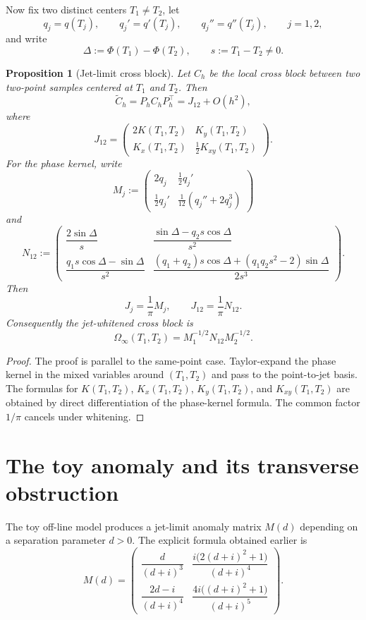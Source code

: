 \documentclass[11pt]{article}
\theoremstyle{plain}
\newtheorem{proposition}[theorem]{Proposition}
\theoremstyle{definition}
\newcommand{\wt}{\widetilde}
\begin{document}
Now fix two distinct centers $T_1\neq T_2$, let
\[
q_j=q(T_j),\qquad q_j'=q'(T_j),\qquad q_j''=q''(T_j),\qquad j=1,2,
\]
and write
\[
\Delta:=\Phi(T_1)-\Phi(T_2),\qquad s:=T_1-T_2\neq 0.
\]

\begin{proposition}[Jet-limit cross block]
Let $C_h$ be the local cross block between two two-point samples centered at $T_1$ and $T_2$. Then
\[
\wt C_h=P_hC_hP_h^\top=J_{12}+O(h^2),
\]
where
\[
J_{12}=
\begin{pmatrix}
2K(T_1,T_2) & K_y(T_1,T_2)\\[1ex]
K_x(T_1,T_2) & \frac12 K_{xy}(T_1,T_2)
\end{pmatrix}.
\]
For the phase kernel, write
\[
M_j:=
\begin{pmatrix}
2q_j & \frac12 q_j'\\[1ex]
\frac12 q_j' & \frac1{12}(q_j''+2q_j^3)
\end{pmatrix}
\]
and
\[
N_{12}:=
\begin{pmatrix}
\dfrac{2\sin\Delta}{s} & \dfrac{\sin\Delta-q_2s\cos\Delta}{s^2}\\[2ex]
\dfrac{q_1s\cos\Delta-\sin\Delta}{s^2} & \dfrac{(q_1+q_2)s\cos\Delta+(q_1q_2s^2-2)\sin\Delta}{2s^3}
\end{pmatrix}.
\]
Then
\[
J_j=\frac1\pi M_j,
\qquad
J_{12}=\frac1\pi N_{12}.
\]
Consequently the jet-whitened cross block is
\[
\Omega_\infty(T_1,T_2)=M_1^{-1/2}N_{12}M_2^{-1/2}.
\]
\end{proposition}

\begin{proof}
The proof is parallel to the same-point case. Taylor-expand the phase kernel in the mixed variables around $(T_1,T_2)$ and pass to the point-to-jet basis. The formulas for $K(T_1,T_2)$, $K_x(T_1,T_2)$, $K_y(T_1,T_2)$, and $K_{xy}(T_1,T_2)$ are obtained by direct differentiation of the phase-kernel formula. The common factor $1/\pi$ cancels under whitening.
\end{proof}

\section{The toy anomaly and its transverse obstruction}

The toy off-line model produces a jet-limit anomaly matrix $M(d)$ depending on a separation parameter $d>0$. The explicit formula obtained earlier is
\[
M(d)=
\begin{pmatrix}
\dfrac{d}{(d+i)^3} & \dfrac{i\bigl(2(d+i)^2+1\bigr)}{(d+i)^4}\\[2ex]
\dfrac{2d-i}{(d+i)^4} & \dfrac{4i\bigl((d+i)^2+1\bigr)}{(d+i)^5}
\end{pmatrix}.
\]
\end{document}
